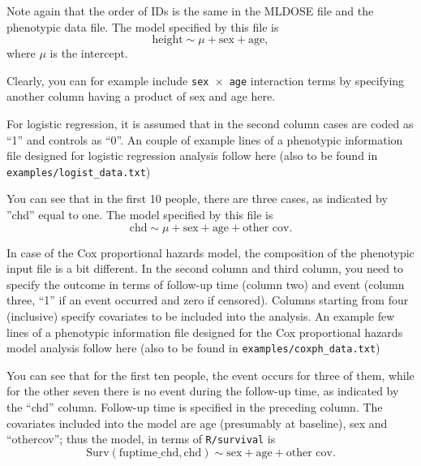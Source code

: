 \documentclass[12pt,a4paper]{article}
\begin{document}

Note again that the order of IDs is the same in the MLDOSE file
and the phenotypic data file. The model specified by this file is
\begin{equation*}
\textrm{height} \sim \mu + \textrm{sex} + \textrm{age},
\end{equation*}
where $\mu$ is the intercept.

Clearly, you can for example include \texttt{sex $\times$ age} interaction terms by
specifying another column having a product of sex and age here.

For logistic regression, it is assumed that in the second column cases are
coded as ``1'' and controls as ``0''. An couple of example lines of a phenotypic
information file designed for logistic regression analysis follow here (also
to be found in \texttt{examples/logist\_data.txt})



You can see that in the first 10 people, there are three cases, as indicated
by ''chd'' equal to one. The model specified by this file
is
\begin{equation*}
\textrm{chd} \sim \mu + \textrm{sex} + \textrm{age} +
\textrm{other cov}.
\end{equation*}

In case of the Cox proportional hazards model, the composition of the
phenotypic input file is a bit different. In the second column and
third column, you need to specify the outcome in terms of follow-up
time (column two) and event (column three, ``1'' if an event occurred
and zero if censored). Columns starting from four (inclusive) specify
covariates to be included into the analysis. An example few lines of
a phenotypic information file designed for the Cox proportional hazards model
analysis follow here (also to be found in
\texttt{examples/coxph\_data.txt})


You can see that for the first ten people, the event occurs for three of
them, while for the other seven there is no event during the follow-up
time, as indicated by the ``chd'' column. Follow-up time is specified in the preceding
column. The covariates included into the model are age (presumably
at baseline), sex and ``othercov''; thus the model, in terms of
\texttt{R/survival} is
\begin{equation*}
\textrm{Surv}(\textrm{fuptime\_chd}, \textrm{chd})
\sim \textrm{sex} + \textrm{age} + \textrm{other cov}.
\end{equation*}
\end{document}
